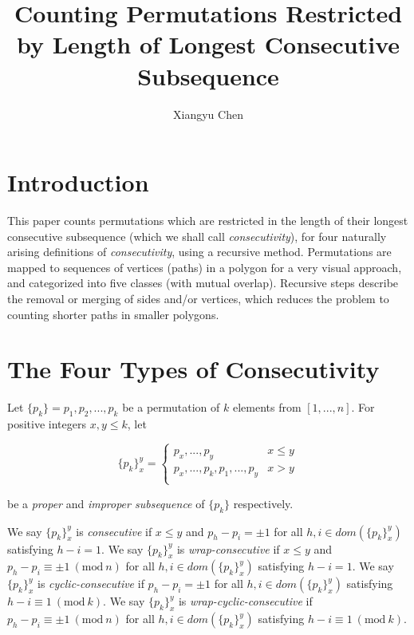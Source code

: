\documentclass[a4paper, 12pt] {article}
\theoremstyle{remark}
\theoremstyle{plain}
\theoremstyle{remark}
\begin{document}
\title{Counting Permutations Restricted by Length of Longest Consecutive Subsequence}
\author{Xiangyu Chen}
\maketitle

\section{Introduction}
\label{introduction}

This paper counts permutations which are restricted in the length of their longest consecutive subsequence (which we shall call \emph{consecutivity}), for four naturally arising definitions of \emph{consecutivity}, using a recursive method. Permutations are mapped to sequences of vertices (paths) in a polygon for a very visual approach, and categorized into five classes (with mutual overlap). Recursive steps describe the removal or merging of sides and/or vertices, which reduces the problem to counting shorter paths in smaller polygons. 


\section{The Four Types of Consecutivity}
\label{four_consecutivities}

\begin{comment}
Let $\{a_m\} = a_1, a_2, ..., a_m$ be a finite sequence containing no repeated elements.
Let $\{a\}_{x}^{y} = a_1, a_2, ..., a_m$ be a subsequence of a permutation of $k$ elements from $[1, ..., n]$.

For positive integers $x, y \leq k$, let $\{p_{i\ \textrm{mod}\ k}\}_{i=x}^{y+k} = p_x, ..., p_y$ be a \textit{subsequence} of $\{p_k\}$.
\end{comment}

Let $\{p_k\} = p_1, p_2, ..., p_k$ be a permutation of $k$ elements from $[1, ..., n]$. For positive integers $x, y \leq k$, let

$$\{p_k\}_{x}^{y} =
\begin{cases}
	p_x, ..., p_y & x\leq y \\
	p_x, ..., p_k, p_1, ..., p_y & x>y \\
\end{cases} $$

\noindent be a \textit{proper} and \textit{improper subsequence} of $\{p_k\}$ respectively.

We say $\{p_k\}_{x}^{y}$ is \textit{consecutive} if $x \leq y$ and $p_h-p_i=\pm1$ for all $h,i \in dom(\{p_k\}_{x}^{y})$ satisfying $h-i = 1$.
We say $\{p_k\}_{x}^{y}$ is \textit{wrap-consecutive} if $x \leq y$ and $p_h-p_i \equiv \pm1 \ (\textrm{mod}\ n)$ for all $h,i \in dom(\{p_k\}_{x}^{y})$ satisfying $h-i = 1$.
We say $\{p_k\}_{x}^{y}$ is \textit{cyclic-consecutive} if $p_h-p_i=\pm1$ for all $h,i \in dom(\{p_k\}_{x}^{y})$ satisfying $h-i \equiv 1 \ (\textrm{mod}\ k)$.
We say $\{p_k\}_{x}^{y}$ is \textit{wrap-cyclic-consecutive} if $p_h-p_i \equiv \pm1 \ (\textrm{mod}\ n)$ for all $h,i \in dom(\{p_k\}_{x}^{y})$ satisfying $h-i \equiv 1 \ (\textrm{mod}\ k)$.
\end{document}
